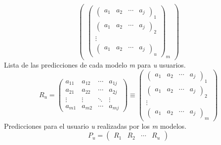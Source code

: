 \begin{center}
\[\begin{pmatrix}
            \begin{pmatrix}
                \begin{pmatrix} a_{1}  &  a_{2}  &  \cdots   & a_{j} \end{pmatrix}_{1} \\ 
                \begin{pmatrix} a_{1}  &  a_{2}  &  \cdots   & a_{j} \end{pmatrix}_{2} \\ 
                \vdots \\ 
                \begin{pmatrix} a_{1}  &  a_{2}  &  \cdots   & a_{j} \end{pmatrix}_{u}
            \end{pmatrix}_{\textit{m}}
        \end{pmatrix}
    \] 
    Lista de las predicciones de cada modelo \textit{m} para \textit{u} usuarios.
    \\
    \[  \textit{R$_{u}$} =
            \begin{pmatrix}
                a_{11}  &  a_{12}  &  \cdots   & a_{1j} \\ 
                a_{21}  &  a_{22}  &  \cdots   & a_{2j}\\ 
                \vdots  &  \vdots  &  \ddots & \vdots  \\ 
                a_{m1}  &  a_{m2}  &  \cdots   & a_{mj}
            \end{pmatrix}
            \equiv
            \begin{pmatrix}
                \begin{pmatrix} a_{1}  &  a_{2}  &  \cdots   & a_{j} \end{pmatrix}_{1} \\ 
                \begin{pmatrix} a_{1}  &  a_{2}  &  \cdots   & a_{j} \end{pmatrix}_{2} \\ 
                \vdots \\ 
                \begin{pmatrix} a_{1}  &  a_{2}  &  \cdots   & a_{j} \end{pmatrix}_{m}
            \end{pmatrix}
    \]
    Predicciones para el usuario \textit{u} realizadas por los \textit{m} modelos.
    \\
    \[  
        \textit{P$_{u}$}=
        \begin{pmatrix}
            \textit{R$_{1}$} & \textit{R$_{2}$} & \cdots & \textit{R$_{u}$}

\end{pmatrix}\]
\end{center}
